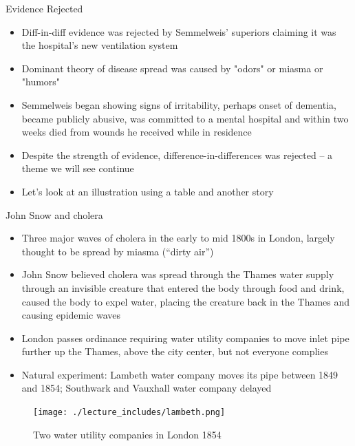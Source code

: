 \documentclass{beamer}
\begin{document}
\begin{frame}{Evidence Rejected}

\begin{itemize}

\item Diff-in-diff evidence was rejected by Semmelweis' superiors claiming it was the hospital's new ventilation system
\item Dominant theory of disease spread was caused by "odors" or miasma or "humors"
\item Semmelweis began showing signs of irritability, perhaps onset of dementia, became publicly abusive, was committed to a mental hospital and within two weeks died from wounds he received while in residence
\item Despite the strength of evidence, difference-in-differences was rejected -- a theme we will see continue
\item Let's look at an illustration using a table and another story

\end{itemize}

\end{frame}






\begin{frame}{John Snow and cholera}

\begin{itemize}
\item Three major waves of cholera in the early to mid 1800s in London, largely thought to be spread by miasma (``dirty air'')
\item John Snow believed cholera was spread through the Thames water supply through an invisible creature that entered the body through food and drink, caused the body to expel water, placing the creature back in the Thames and causing epidemic waves
\item London passes ordinance requiring water utility companies to move inlet pipe further up the Thames, above the city center, but not everyone complies
\item Natural experiment: Lambeth water company moves its pipe between 1849 and 1854; Southwark and Vauxhall water company delayed
\end{itemize}

\end{frame}


\begin{frame}

	\begin{figure}
	\caption{Two water utility companies in London 1854}
	\texttt{[image: ./lecture\_includes/lambeth.png]}
	\end{figure}


\end{frame}
\end{document}
